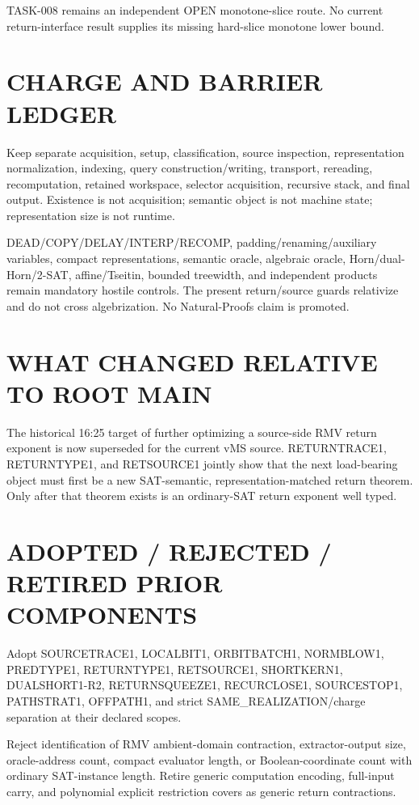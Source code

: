 \documentclass[11pt]{article}
\begin{document}
TASK-008 remains an independent OPEN monotone-slice route. No current return-interface result supplies its missing hard-slice monotone lower bound.

\section*{CHARGE AND BARRIER LEDGER}
Keep separate acquisition, setup, classification, source inspection, representation normalization, indexing, query construction/writing, transport, rereading, recomputation, retained workspace, selector acquisition, recursive stack, and final output. Existence is not acquisition; semantic object is not machine state; representation size is not runtime.

DEAD/COPY/DELAY/INTERP/RECOMP, padding/renaming/auxiliary variables, compact representations, semantic oracle, algebraic oracle, Horn/dual-Horn/2-SAT, affine/Tseitin, bounded treewidth, and independent products remain mandatory hostile controls. The present return/source guards relativize and do not cross algebrization. No Natural-Proofs claim is promoted.

\section*{WHAT CHANGED RELATIVE TO ROOT MAIN}
The historical 16:25 target of further optimizing a source-side RMV return exponent is now superseded for the current vMS source. RETURNTRACE1, RETURNTYPE1, and RETSOURCE1 jointly show that the next load-bearing object must first be a new SAT-semantic, representation-matched return theorem. Only after that theorem exists is an ordinary-SAT return exponent well typed.

\section*{ADOPTED / REJECTED / RETIRED PRIOR COMPONENTS}
Adopt SOURCETRACE1, LOCALBIT1, ORBITBATCH1, NORMBLOW1, PREDTYPE1, RETURNTYPE1, RETSOURCE1, SHORTKERN1, DUALSHORT1-R2, RETURNSQUEEZE1, RECURCLOSE1, SOURCESTOP1, PATHSTRAT1, OFFPATH1, and strict SAME_REALIZATION/charge separation at their declared scopes.

Reject identification of RMV ambient-domain contraction, extractor-output size, oracle-address count, compact evaluator length, or Boolean-coordinate count with ordinary SAT-instance length. Retire generic computation encoding, full-input carry, and polynomial explicit restriction covers as generic return contractions.
\end{document}
